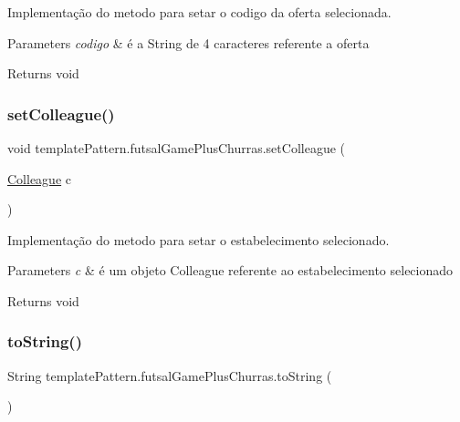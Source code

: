 Implementação do metodo para setar o codigo da oferta selecionada. 


\begin{DoxyParams}{Parameters}
{\em codigo} & é a String de 4 caracteres referente a oferta \\
\hline
\end{DoxyParams}
\begin{DoxyReturn}{Returns}
void 
\end{DoxyReturn}
\mbox{\label{classtemplate_pattern_1_1futsal_game_plus_churras_a10a0a6fd592244b58dfd867ad4807083}} 
\subsubsection{\texorpdfstring{setColleague()}{setColleague()}}
{\footnotesize\ttfamily void template\+Pattern.\+futsal\+Game\+Plus\+Churras.\+set\+Colleague (\begin{DoxyParamCaption}\item[{\mbox{\hyperlink{classmediator_pattern_1_1_colleague}{Colleague}}}]{c }\end{DoxyParamCaption})}



Implementação do metodo para setar o estabelecimento selecionado. 


\begin{DoxyParams}{Parameters}
{\em c} & é um objeto Colleague referente ao estabelecimento selecionado \\
\hline
\end{DoxyParams}
\begin{DoxyReturn}{Returns}
void 
\end{DoxyReturn}
\mbox{\label{classtemplate_pattern_1_1futsal_game_plus_churras_a18aecf4c078fc5ae8ca440ff3d7d67e0}} 
\subsubsection{\texorpdfstring{toString()}{toString()}}
{\footnotesize\ttfamily String template\+Pattern.\+futsal\+Game\+Plus\+Churras.\+to\+String (\begin{DoxyParamCaption}{ }\end{DoxyParamCaption})}



